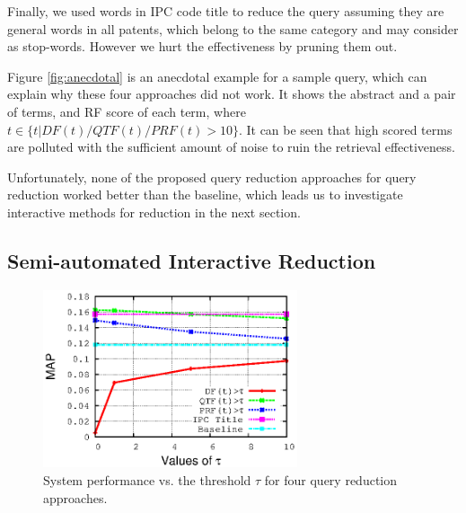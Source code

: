 Finally, we used words in IPC code title to reduce the query assuming they are general words in all patents, which belong to the same category and may consider as stop-words. However we hurt the effectiveness by pruning them out.

Figure \ref{fig:anecdotal} is an anecdotal example for a sample query, which can explain why these four approaches did not work. It shows the abstract and a pair of terms, and RF score of each term, where $t \in \{t| DF(t)/QTF(t)/PRF(t)>10\} $. It can be seen that high scored terms are polluted with the sufficient amount of noise to ruin the retrieval effectiveness.   

Unfortunately, none of the proposed query reduction approaches for query reduction worked better than the baseline, which leads us to investigate interactive methods for reduction in the next section.

\subsection{Semi-automated Interactive Reduction}

\begin{figure}[t!]
\begin{centering}
\includegraphics[width=7.5cm]{imgs/figure2-MAP}
\par\end{centering}

\protect\caption{System performance vs. the threshold $\tau$ for four query reduction approaches.}
\label{fig:queryreduc}
\end{figure}

